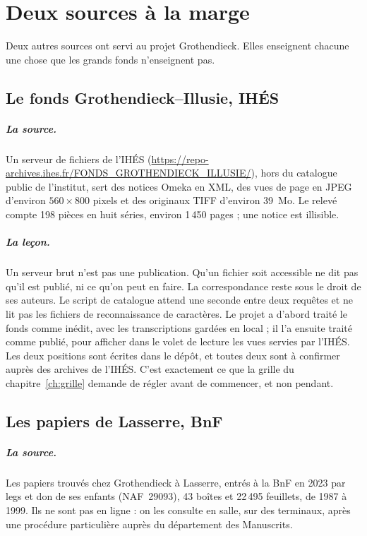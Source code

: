 \chapter{Deux sources à la marge}\label{ch:autres}

Deux autres sources ont servi au projet Grothendieck. Elles enseignent chacune une chose
que les grands fonds n'enseignent pas.

\section{Le fonds Grothendieck--Illusie, IHÉS}

\paragraph{La source.} Un serveur de fichiers de l'IHÉS
(\url{https://repo-archives.ihes.fr/FONDS_GROTHENDIECK_ILLUSIE/}), hors du catalogue public de
l'institut, sert des notices Omeka en XML, des vues de page en JPEG d'environ
$560\times 800$ pixels et des originaux TIFF d'environ 39~Mo. Le relevé compte 198 pièces en
huit séries, environ 1\,450 pages ; une notice est illisible.

\paragraph{La leçon.} Un serveur brut n'est pas une publication. Qu'un fichier
soit accessible ne dit pas qu'il est publié, ni ce qu'on peut en faire. La correspondance
reste sous le droit de ses auteurs. Le script de catalogue attend une seconde entre deux
requêtes et ne lit pas les fichiers de reconnaissance de caractères. Le projet a d'abord
traité le fonds comme inédit, avec les transcriptions gardées en local ; il l'a ensuite
traité comme publié, pour afficher dans le volet de lecture les vues servies par l'IHÉS.
Les deux positions sont écrites dans le dépôt, et toutes deux sont à confirmer auprès des
archives de l'IHÉS. C'est exactement ce que la grille du chapitre~\ref{ch:grille} demande
de régler avant de commencer, et non pendant.

\section{Les papiers de Lasserre, BnF}

\paragraph{La source.} Les papiers trouvés chez Grothendieck à Lasserre, entrés à la BnF en
2023 par legs et don de ses enfants (NAF~29093), 43 boîtes et 22\,495 feuillets, de 1987 à
1999. Ils ne sont pas en ligne : on les consulte en salle, sur des terminaux, après une
procédure particulière auprès du département des Manuscrits.

